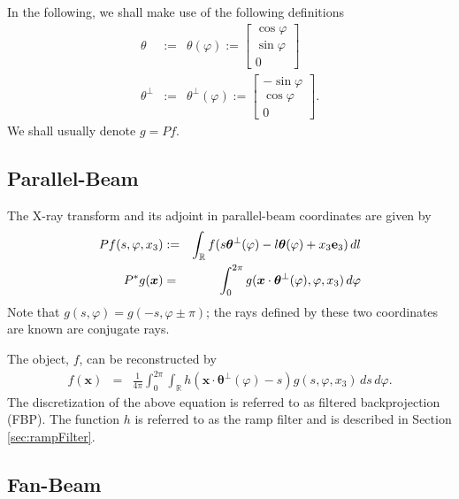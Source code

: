 \documentclass[11pt]{article}
\begin{document}
In the following, we shall make use of the following definitions
\begin{eqnarray*}
\theta &:=& \theta(\varphi) := \begin{bmatrix} \cos\varphi \\ \sin\varphi \\ 0 \end{bmatrix} \\
\theta^\perp &:=& \theta^\perp(\varphi) := \begin{bmatrix} -\sin\varphi \\ \cos\varphi \\ 0 \end{bmatrix}.
\end{eqnarray*}
We shall usually denote $g = Pf$.

\subsection{Parallel-Beam}

The X-ray transform and its adjoint in parallel-beam coordinates are given by 
\begin{eqnarray*}
Pf(s, \varphi, x_3) &:=& \int_\mathbb{R} f(s\bm{\theta}^\perp(\varphi) - l\bm{\theta}(\varphi) + x_3\textbf{e}_3) \, dl \\
P^*g(\bm{x}) &=& \int_0^{2\pi} g(\bm{x}\cdot\bm{\theta}^\perp(\varphi), \varphi, x_3) \, d\varphi
\end{eqnarray*}
Note that $g(s,\varphi) = g(-s,\varphi \pm \pi)$; the rays defined by these two coordinates are known are conjugate rays.

The object, $f$, can be reconstructed by
\begin{eqnarray*}
f(\bm{x}) &=& \frac{1}{4\pi} \int_0^{2\pi} \int_\mathbb{R} h(\bm{x}\cdot\bm{\theta}^\perp(\varphi) - s) g(s,\varphi, x_3) \, ds \, d\varphi.
\end{eqnarray*}
The discretization of the above equation is referred to as filtered backprojection (FBP).  The function $h$ is referred to as the ramp filter and is described in Section \ref{sec:rampFilter}.

\subsection{Fan-Beam}
\end{document}
